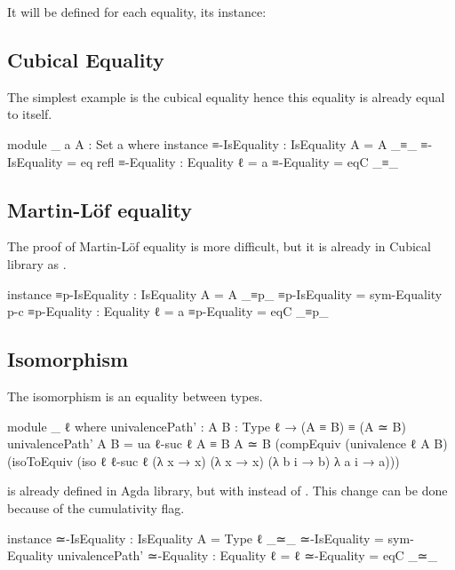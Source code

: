\documentclass{article}
\begin{document}
It will be defined for each equality, its instance:

\subsection{Cubical Equality}

The simplest example is the cubical equality hence this equality is already equal to itself.

\begin{code}
module _ {a} {A : Set a} where
  instance
    ≡-IsEquality : IsEquality {A = A} _≡_
    ≡-IsEquality = eq refl
  ≡-Equality : Equality {ℓ = a}
  ≡-Equality = eqC _≡_

\end{code}

\subsection{Martin-Löf equality}

The proof of Martin-Löf equality is more difficult, but it is already in Cubical library as .

\begin{code}
  instance
    ≡p-IsEquality : IsEquality {A = A} _≡p_
    ≡p-IsEquality = sym-Equality p-c
  ≡p-Equality : Equality {ℓ = a}
  ≡p-Equality = eqC _≡p_
\end{code}

\subsection{Isomorphism}

The isomorphism is an equality between types.

\begin{code}
module _ {ℓ} where
  univalencePath' : {A B : Type ℓ} → (A ≡ B) ≡ (A ≃ B)
  univalencePath' {A} {B} =
    ua {ℓ-suc ℓ} {A ≡ B} {A ≃ B} (compEquiv (univalence {ℓ} {A} {B})
    (isoToEquiv (iso {ℓ} {ℓ-suc ℓ}
    (λ x → x) (λ x → x) (λ b i → b) λ a i → a)))
\end{code}

 is already defined in Agda library, but with  instead of
. This change can be done because of the cumulativity flag.

\begin{code}
  instance
    ≃-IsEquality : IsEquality
      {A = Type ℓ} _≃_
    ≃-IsEquality = sym-Equality univalencePath'
  ≃-Equality : Equality {ℓ = ℓ}
  ≃-Equality = eqC _≃_
\end{code}
\end{document}
